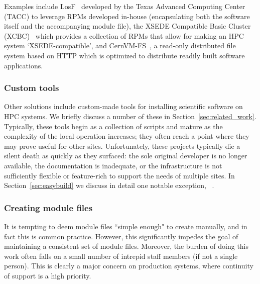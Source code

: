 Examples include LosF~\cite{lmodSC11} developed by the Texas
Advanced Computing Center (TACC) to leverage RPMs developed in-house
(encapsulating both the software itself and the
accompanying module file), the XSEDE Compatible Basic Cluster (XCBC)~\cite{Fischer14}
which provides a collection of RPMs that allow for making an HPC system
`XSEDE-compatible', and CernVM-FS~\cite{cernvm-fs}, a read-only distributed file
system based on HTTP which is optimized to distribute readily built software
applications.

\subsubsection{Custom tools}

Other solutions include custom-made tools for installing scientific software
on HPC systems. We briefly discuss a number of these in
Section~\ref{sec:related_work}. Typically, these tools begin as a collection of scripts and mature as the complexity of the local operation increases; they often reach a point where they may prove useful for other sites. Unfortunately, these projects typically die a
silent death as quickly as they surfaced: the sole original developer is no longer available, the documentation is inadequate, or the
infrastructure is not sufficiently flexible or feature-rich to support the needs of multiple sites. In Section~\ref{sec:easybuild} we discuss in detail one notable
exception, \easybuild{}~\cite{EasyBuildSC12}.

\subsubsection{Creating module files}

It is tempting to deem module files ``simple enough" to create 
manually, and in fact this is common practice. However, this significantly impedes
the goal of maintaining a consistent set of module files. Moreover, the burden of doing this work often falls on a small number of intrepid staff members (if not a single person). This is clearly a major concern
on production systems, where continuity of support is a high priority.


